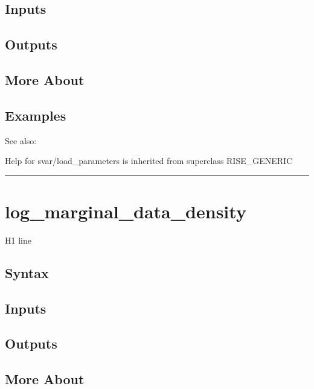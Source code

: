 \documentclass[letterpaper,10pt,english]{sphinxmanual}
\begin{document}
\subsection{Inputs}
\label{classes/models/@svar/svar:id45}

\subsection{Outputs}
\label{classes/models/@svar/svar:id46}

\subsection{More About}
\label{classes/models/@svar/svar:id47}

\subsection{Examples}
\label{classes/models/@svar/svar:id48}
See also:

Help for svar/load\_parameters is inherited from superclass RISE\_GENERIC


\bigskip\hrule{}\bigskip



\section{log\_marginal\_data\_density}
\label{classes/models/@svar/svar:log-marginal-data-density}\label{classes/models/@svar/svar:id49}
H1 line


\subsection{Syntax}
\label{classes/models/@svar/svar:id50}

\subsection{Inputs}
\label{classes/models/@svar/svar:id51}

\subsection{Outputs}
\label{classes/models/@svar/svar:id52}

\subsection{More About}
\label{classes/models/@svar/svar:id53}
\end{document}

